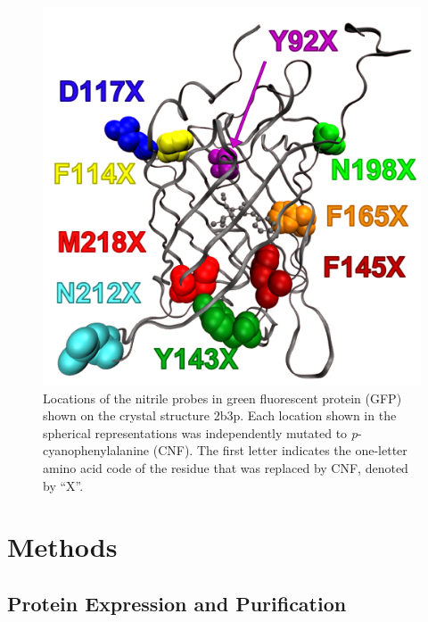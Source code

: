 \begin{figure}
    \center
    \includegraphics[width=\single]{figures-gfp-hbond/system.png}
    \caption{
        Locations of the nitrile probes in green fluorescent protein (GFP) shown on the crystal structure 2b3p. 
        Each location shown in the spherical representations was independently mutated to \emph{p}-cyanophenylalanine (CNF). 
        The first letter indicates the one-letter amino acid code of the residue that was replaced by CNF, denoted by ``X''.
    }
    \label{fig:hbond-system}
\end{figure}

\section{Methods}

\subsection{Protein Expression and Purification}

